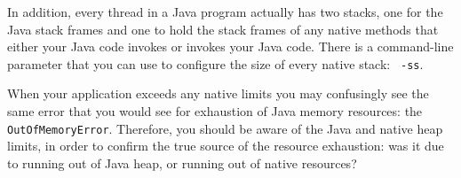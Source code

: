 In addition, every thread in a Java program actually has two stacks, one for the
Java stack frames and one to hold the stack frames of any native methods that
either your Java code invokes or invokes your Java code. There is a command-line
parameter that you can use to configure the size of every native stack: {\tt
-ss}.

When your application exceeds any native limits you may confusingly see the same
error that you would see for exhaustion of Java memory resources: the {\tt
OutOf\-Memory\-Error}. Therefore, you should be aware of the Java and native
heap limits, in order to confirm the true source of the resource exhaustion: was it
due to running out of Java heap, or running out of native resources?





